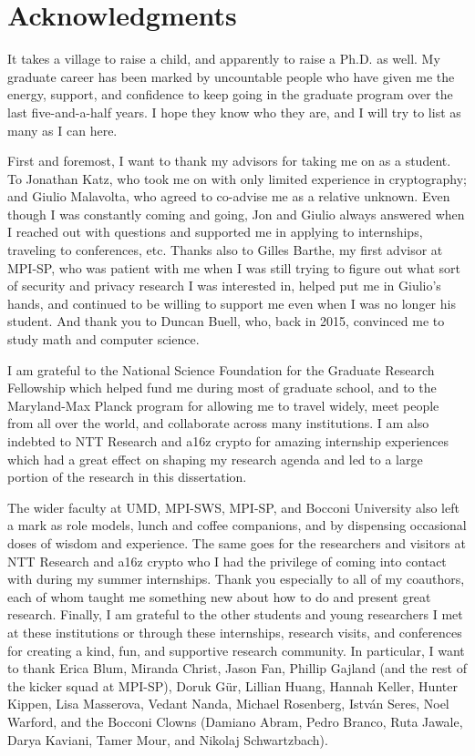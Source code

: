 \chapter{Acknowledgments}

It takes a village to raise a child, and apparently to raise a Ph.D. as well. My graduate career has been marked by uncountable people who have given me the energy, support, and confidence to keep going in the graduate program over the last five-and-a-half years. I hope they know who they are, and I will try to list as many as I can here.

First and foremost, I want to thank my advisors for taking me on as a student. To Jonathan Katz, who took me on with only limited experience in cryptography; and Giulio Malavolta, who agreed to co-advise me as a relative unknown. Even though I was constantly coming and going, Jon and Giulio always answered when I reached out with questions and supported me in applying to internships, traveling to conferences, etc. Thanks also to Gilles Barthe, my first advisor at MPI-SP, who was patient with me when I was still trying to figure out what sort of security and privacy research I was interested in, helped put me in Giulio's hands, and continued to be willing to support me even when I was no longer his student. And thank you to Duncan Buell, who, back in 2015, convinced me to study math and computer science.

I am grateful to the National Science Foundation for the Graduate Research Fellowship which helped fund me during most of graduate school, and to the Maryland-Max Planck program for allowing me to travel widely, meet people from all over the world, and collaborate across many institutions. I am also indebted to NTT Research and a16z crypto for amazing internship experiences which had a great effect on shaping my research agenda and led to a large portion of the research in this dissertation.

The wider faculty at UMD, MPI-SWS, MPI-SP, and Bocconi University also left a mark as role models, lunch and coffee companions, and by dispensing occasional doses of wisdom and experience. The same goes for the researchers and visitors at NTT Research and a16z crypto who I had the privilege of coming into contact with during my summer internships. Thank you especially to all of my coauthors, each of whom taught me something new about how to do and present great research. Finally, I am grateful to the other students and young researchers I met at these institutions or through these internships, research visits, and conferences for creating a kind, fun, and supportive research community. In particular, I want to thank Erica Blum, Miranda Christ, Jason Fan, Phillip Gajland (and the rest of the kicker squad at MPI-SP), Doruk G\"ur, Lillian Huang, Hannah Keller, Hunter Kippen, Lisa Masserova, Vedant Nanda, Michael Rosenberg, Istv\'an Seres, Noel Warford, and the Bocconi Clowns (Damiano Abram, Pedro Branco, Ruta Jawale, Darya Kaviani, Tamer Mour, and Nikolaj Schwartzbach).

